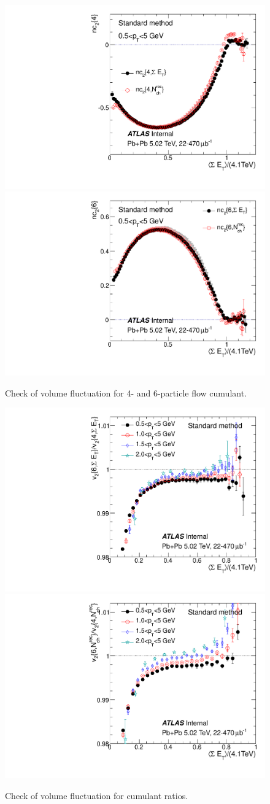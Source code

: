 \begin{figure}[H]
\centering
\includegraphics[width=.32\linewidth]{figs/sec_paper/comp_nc4comp_t0_har2_pt0.pdf}
\includegraphics[width=.32\linewidth]{figs/sec_paper/comp_nc6comp_t0_har2_pt0.pdf}
\caption{Check of volume fluctuation for 4- and 6-particle flow cumulant.}
\label{fig:paper_vf_v4}
\end{figure}

\begin{figure}[H]
\centering
\includegraphics[width=.32\linewidth]{figs/sec_paper/comp_vn6vn4_har2_FCal.pdf}
\includegraphics[width=.32\linewidth]{figs/sec_paper/comp_vn6vn4_har2_Nchb.pdf}
\caption{Check of volume fluctuation for cumulant ratios.}
\label{fig:paper_vf_cr}
\end{figure}

